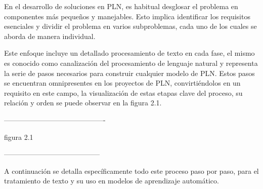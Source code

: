 En el desarrollo de soluciones en PLN, es habitual desglosar el problema en componentes más pequeños y manejables. Esto implica identificar los requisitos esenciales y dividir el problema en varios subproblemas, cada uno de los cuales se aborda de manera individual.

Este enfoque incluye un detallado procesamiento de texto en cada fase, el mismo es conocido como canalización del procesamiento de lenguaje natural y representa la serie de pasos necesarios para construir cualquier modelo de PLN. Estos pasos se encuentran omnipresentes en los proyectos de PLN, convirtiéndolos en un requisito en este campo, la visualización de estas etapas clave del proceso, su relación y orden se puede observar en la figura 2.1.

-------------------------------------------

figura 2.1

-----------------------------------------

A continuación se detalla específicamente todo este proceso paso por paso, para el tratamiento de texto y su uso en modelos de aprendizaje automático.

